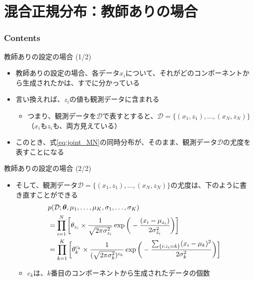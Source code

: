 \documentclass[aspectratio=169,unicode,dvipdfmx,14pt]{beamer}
\begin{document}
\section{混合正規分布：教師ありの場合}

\begin{frame}\frametitle{Contents}
\Large \tableofcontents[currentsection]
\end{frame}


\begin{frame}{教師ありの設定の場合 (1/2)}
\begin{itemize}
\item 教師ありの設定の場合、各データ$x_i$について、それがどのコンポーネントから生成されたかは、すでに分かっている
\item 言い換えれば、$z_i$の値も観測データに含まれる
\begin{itemize}
\item つまり、観測データを$\mathcal{D}$で表すとすると、$\mathcal{D} = \{ (x_1,z_1), \ldots, (x_N,z_N) \}$
（$x_i$も$z_i$も、両方見えている）
\end{itemize}
\item このとき、式\eqref{eq:joint_MN}の同時分布が、そのまま、観測データ$\mathcal{D}$の尤度を表すことになる
\end{itemize}
\end{frame}

\begin{frame}{教師ありの設定の場合 (2/2)}
\begin{itemize}
\item そして、観測データ$\mathcal{D} = \{ (x_1,z_1), \ldots, (x_N,z_N) \}$の尤度は、下のように書き直すことができる
\vspace{-.15in}
\begin{align}
& p(\mathcal{D};\bm{\theta},\mu_1,\ldots,\mu_K,\sigma_1,\ldots,\sigma_K)
\notag \\ &
= \prod_{i=1}^N \bigg[ \theta_{z_i} \times \frac{1}{\sqrt{2\pi\sigma_{z_i}^2}}\exp\bigg( - \frac{(x_i - \mu_{z_i})}{2\sigma_{z_i}^2} \bigg) \bigg]
\notag \\ &
= \prod_{k=1}^K \bigg[ \theta_k^{c_k} \times \frac{1}{ (\sqrt{2\pi\sigma_k^2} )^{c_k}} 
\exp\bigg( - \frac{ \sum_{ \{ i : z_i = k \} } (x_i - \mu_k)^2 }{2\sigma_k^2} \bigg) \bigg]
\label{eq:likelihood_MN}
\end{align}
\vspace{-.15in}
\begin{itemize}
\item $c_k$は、$k$番目のコンポーネントから生成されたデータの個数
\end{itemize}
\end{itemize}
\end{frame}
\end{document}
